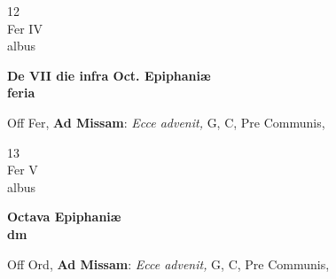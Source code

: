 \documentclass[10pt, openany]{book}
\begin{document}
        \begin{center}
            \begin{minipage}{3.5in}
                \vspace{2em}
                \begin{minipage}{0.5in}
                    {\Huge 12} \\
                    {\normalsize Fer IV} \\
                    {\normalsize albus}
                \end{minipage}
                \begin{minipage}{3.0in}
                    \textbf{ \large De VII die infra Oct. Epiphaniæ \\
                    \textnormal{\normalsize feria}} \\ 
                \end{minipage}
                \begin{justify}Off Fer, \textbf{Ad Missam}: \textit{Ecce advenit,} G, C, Pre Communis,   
                \end{justify}
            \end{minipage}
        \end{center}
    
        \begin{center}
            \begin{minipage}{3.5in}
                \vspace{2em}
                \begin{minipage}{0.5in}
                    {\Huge 13} \\
                    {\normalsize Fer V} \\
                    {\normalsize albus}
                \end{minipage}
                \begin{minipage}{3.0in}
                    \textbf{ \large Octava Epiphaniæ \\
                    \textnormal{\normalsize dm}} \\ 
                \end{minipage}
                \begin{justify}Off Ord, \textbf{Ad Missam}: \textit{Ecce advenit,} G, C, Pre Communis,   
                \end{justify}
            \end{minipage}
        \end{center}
    
\end{document}
